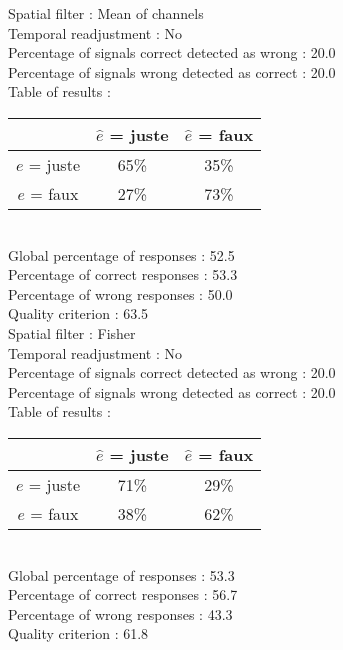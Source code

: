Spatial filter : Mean of channels \\
Temporal readjustment : No \\
Percentage of signals correct detected as wrong :   20.0 \\
Percentage of signals wrong detected as correct :   20.0 \\
Table of results : \\
\begin{tabular}{|c|c|c|}
\hline				& $\hat{e}$ = juste & $\hat{e}$ = faux \\
\hline  $e$ = juste	&     65\%			&     35\%		\\
\hline  $e$ = faux	&     27\%			&     73\%		\\
\hline
\end{tabular}\\
Global percentage of responses :   52.5 \\
Percentage of correct responses :   53.3 \\
Percentage of wrong responses :   50.0 \\
Quality criterion :   63.5 \\

Spatial filter : Fisher \\
Temporal readjustment : No \\
Percentage of signals correct detected as wrong :   20.0 \\
Percentage of signals wrong detected as correct :   20.0 \\
Table of results : \\
\begin{tabular}{|c|c|c|}
\hline				& $\hat{e}$ = juste & $\hat{e}$ = faux \\
\hline  $e$ = juste	&     71\%			&     29\%		\\
\hline  $e$ = faux	&     38\%			&     62\%		\\
\hline
\end{tabular}\\
Global percentage of responses :   53.3 \\
Percentage of correct responses :   56.7 \\
Percentage of wrong responses :   43.3 \\
Quality criterion :   61.8 \\

